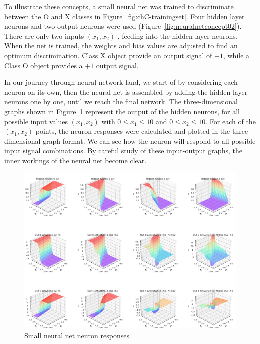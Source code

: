 To illustrate these concepts, a small neural net was trained to discriminate between the O and X classes in Figure~\ref{fig:chC-trainingset}.  Four hidden layer neurons and two output neurons were used (Figure~\ref{fig:neuralnetconcept02}).  There are only two inputs $(x_1,x_2)$ , feeding into the hidden layer neurons.  When the net is trained, the weights and bias values are adjusted to find an optimum discrimination.  Class X object provide an output signal of $-1$, while a Class O object provides a $+1$ output signal.  

In our journey through neural network land,  we start of by considering each neuron on its own, then the neural net is assembled by adding the hidden layer neurons one by one, until we reach the final network.  The three-dimensional graphs shown in Figure~\ref{fig:chC-hiddeneurons04} represent the output of the hidden neurons, for all possible input values  $(x_1,x_2)$  with $0\leq x_1 \leq 10$  and  $0\leq x_2 \leq 10$.    For each of the $(x_1,x_2)$ points, the neuron responses were calculated and plotted in the three-dimensional graph format.   We can see how the neuron will respond to all possible input signal combinations.   By careful study of these input-output graphs, the inner workings of the neural net become clear.
 
\begin{figure}[tbhp]
\centering
\includegraphics[height=1.1\textwidth,angle=90]{pic/chC-hiddeneurons04}
\caption{Small neural net neuron responses}
\label{fig:chC-hiddeneurons04}
\end{figure}

